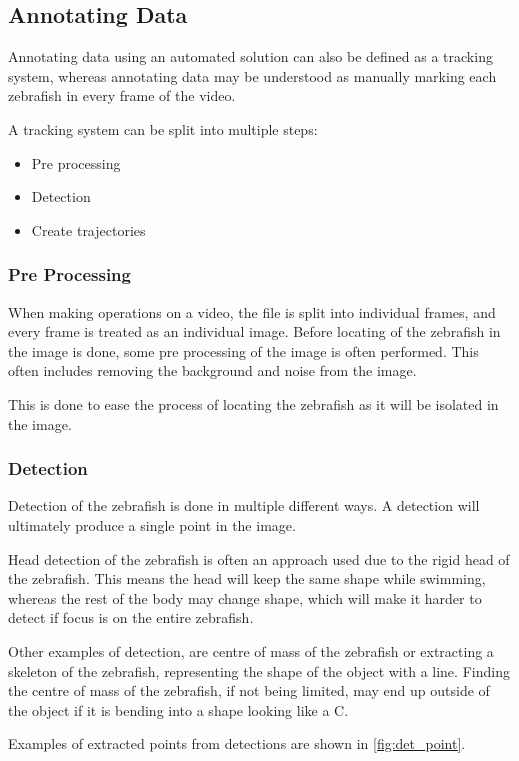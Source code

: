 \subsection{Annotating Data}

Annotating data using an automated solution can also be defined as a tracking system, whereas annotating data may be understood as manually marking each zebrafish in every frame of the video. 

A tracking system can be split into multiple steps:

\begin{itemize}
	\item Pre processing
	\item Detection
	\item Create trajectories
\end{itemize}

\subsubsection{Pre Processing}
When making operations on a video, the file is split into individual frames, and every frame is treated as an individual image. Before locating of the zebrafish in the image is done, some pre processing of the image is often performed. This often includes removing the background and noise from the image.

This is done to ease the process of locating the zebrafish as it will be isolated in the image.

\subsubsection{Detection}
Detection of the zebrafish is done in multiple different ways. A detection will ultimately produce a single point in the image.

Head detection of the zebrafish is often an approach used due to the rigid head of the zebrafish. This means the head will keep the same shape while swimming, whereas the rest of the body may change shape, which will make it harder to detect if focus is on the entire zebrafish.

Other examples of detection, are centre of mass of the zebrafish or extracting a skeleton of the zebrafish, representing the shape of the object with a line. Finding the centre of mass of the zebrafish, if not being limited, may end up outside of the object if it is bending into a shape looking like a C.

Examples of extracted points from detections are shown in \autoref{fig:det_point}.

